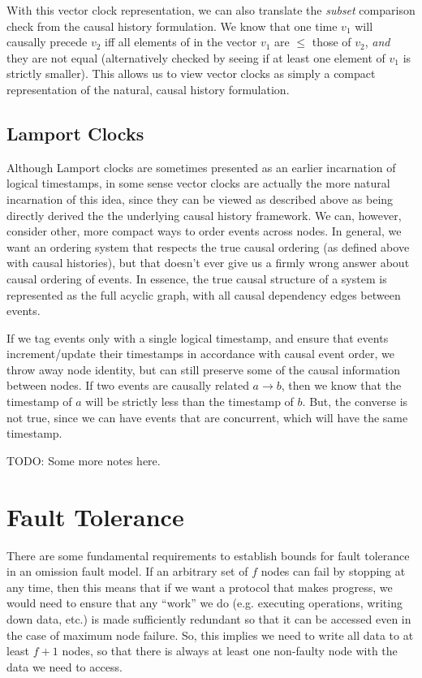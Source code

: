 \documentclass[10pt,a4paper]{article}
\begin{document}
With this vector clock representation, we can also translate the \textit{subset} comparison check from the causal history formulation. We know that one time $v_1$ will causally precede $v_2$ iff all elements of in the vector $v_1$ are $\leq$ those of $v_2$, \textit{and} they are not equal (alternatively checked by seeing if at least one element of $v_1$ is strictly smaller). This allows us to view vector clocks as simply a compact representation of the natural, causal history formulation.

\subsection{Lamport Clocks}

Although Lamport clocks are sometimes presented as an earlier incarnation of logical timestamps, in some sense vector clocks are actually the more natural incarnation of this idea, since they can be viewed as described above as being directly derived the the underlying causal history framework. We can, however, consider other, more compact ways to order events across nodes. In general, we want an ordering system that respects the true causal ordering (as defined above with causal histories), but that doesn't ever give us a firmly wrong answer about causal ordering of events. In essence, the true causal structure of a system is represented as the full acyclic graph, with all causal dependency edges between events. 

If we tag events only with a single logical timestamp, and ensure that events increment/update their timestamps in accordance with causal event order, we throw away node identity, but can still preserve some of the causal information between nodes. If two events are causally related $a \rightarrow b$, then we know that the timestamp of $a$ will be strictly less than the timestamp of $b$. But, the converse is not true, since we can have events that are concurrent, which will have the same timestamp.

TODO: Some more notes here.


\section{Fault Tolerance}

There are some fundamental requirements to establish bounds for fault tolerance in an omission fault model. If an arbitrary set of $f$ nodes can fail by stopping at any time, then this means that if we want a protocol that makes progress, we would need to ensure that any ``work'' we do (e.g. executing operations, writing down data, etc.) is made sufficiently redundant so that it can be accessed even in the case of maximum node failure. So, this implies we need to write all data to at least $f+1$ nodes, so that there is always at least one non-faulty node with the data we need to access. 
\end{document}
